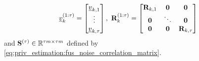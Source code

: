 \begin{equation*}
  \vec{v}_k^{(1:\tau)}=
  \begin{bmatrix}
    \vec{v}_{k,1}\\
    \vdots\\
    \vec{v}_{k,\tau}
  \end{bmatrix},\ 
  \mat{R}_k^{(1:\tau)}=
    \begin{bmatrix}
      \mat{R}_{k,1} & \mat{0} & \mat{0}\\
      \mat{0} & \ddots & \mat{0}\\
      \mat{0} & \mat{0} & \mat{R}_{k,\tau}
    \end{bmatrix}\,
\end{equation*}
and ${{\mathbf{S}}}^{(\tau)} \in \mathbb{R}^{\tau m\times \tau m}$ defined by \eqref{eq:priv_estimation:fus_noise_correlation_matrix}.

